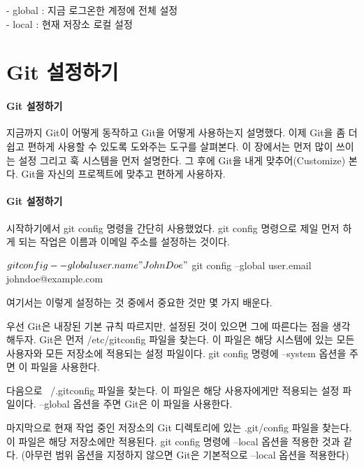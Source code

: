 \documentclass[12pt, a4paper, oneside]{book}
\let\stdsection\section
\renewcommand\section{\newpage\stdsection}
\begin{document}
		\begin{tcolorbox}
			- global : 지금 로그온한 계정에 전체 설정 \\
			- local : 현재 저장소 로컬 설정
		\end{tcolorbox}


%	
	\section 	{ Git 설정하기}

\paragraph{Git 설정하기}
지금까지 Git이 어떻게 동작하고 Git을 어떻게 사용하는지 설명했다. 이제 Git을 좀 더 쉽고 편하게 사용할 수 있도록 도와주는 도구를 살펴본다. 
이 장에서는 먼저 많이 쓰이는 설정 그리고 훅 시스템을 먼저 설명한다. 
그 후에 Git을 내게 맞추어(Customize) 본다. Git을 자신의 프로젝트에 맞추고 편하게 사용하자.



\paragraph{Git 설정하기}
시작하기에서 git config 명령을 간단히 사용했었다. git config 명령으로 제일 먼저 하게 되는 작업은 이름과 이메일 주소를 설정하는 것이다.

$ git config --global user.name "John Doe"
$ git config --global user.email johndoe@example.com

여기서는 이렇게 설정하는 것 중에서 중요한 것만 몇 가지 배운다.

우선 Git은 내장된 기본 규칙 따르지만, 설정된 것이 있으면 그에 따른다는 점을 생각해두자. Git은 먼저 /etc/gitconfig 파일을 찾는다. 
이 파일은 해당 시스템에 있는 모든 사용자와 모든 저장소에 적용되는 설정 파일이다. git config 명령에 --system 옵션을 주면 이 파일을 사용한다.

다음으로 ~/.gitconfig 파일을 찾는다. 이 파일은 해당 사용자에게만 적용되는 설정 파일이다. --global 옵션을 주면 Git은 이 파일을 사용한다.

마지막으로 현재 작업 중인 저장소의 Git 디렉토리에 있는 .git/config 파일을 찾는다. 
이 파일은 해당 저장소에만 적용된다. 
git config 명령에 --local 옵션을 적용한 것과 같다. 
(아무런 범위 옵션을 지정하지 않으면 Git은 기본적으로 --local 옵션을 적용한다)
\end{document}
